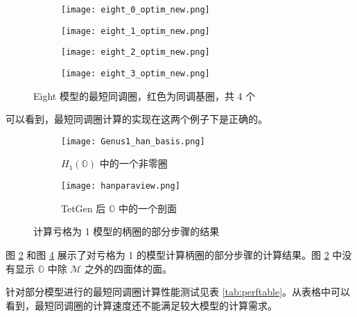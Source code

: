 \begin{figure}[h]
    \centering
    \begin{subfigure}{.2\textwidth}
        \centering
        \texttt{[image: eight\_0\_optim\_new.png]}
    \end{subfigure}
    \begin{subfigure}{.2\textwidth}
        \centering
        \texttt{[image: eight\_1\_optim\_new.png]}
    \end{subfigure}
    \begin{subfigure}{.2\textwidth}
        \centering
        \texttt{[image: eight\_2\_optim\_new.png]}
    \end{subfigure}
    \begin{subfigure}{.2\textwidth}
        \centering
        \texttt{[image: eight\_3\_optim\_new.png]}
    \end{subfigure}
    \caption{Eight 模型的最短同调圈，红色为同调基圈，共 4 个}
    \label{fig:eighthim}
\end{figure}

可以看到，最短同调圈计算的实现在这两个例子下是正确的。

\begin{figure}[h]
    \begin{subfigure}{.5\textwidth}
        \centering
        \texttt{[image: Genus1\_han\_basis.png]}
        \caption{$ H_1(\mathbb{O}) $ 中的一个非零圈}
        \label{fig:hanh1o}
    \end{subfigure}
    \begin{subfigure}{.5\textwidth}
        \centering
        \texttt{[image: hanparaview.png]}
        \caption{TetGen 后 $ \mathbb{O} $ 中的一个剖面}
        \label{fig:hanparaview}
    \end{subfigure}
    \caption{计算亏格为 1 模型的柄圈的部分步骤的结果}
\end{figure}

图 \ref{fig:hanh1o} 和图 \ref{fig:hanparaview} 展示了对亏格为 1 的模型计算柄圈的部分步骤的计算结果。图 \ref{fig:hanh1o} 中没有显示 $ \mathbb{O} $ 中除 $ \mathcal{M} $ 之外的四面体的面。

针对部分模型进行的最短同调圈计算性能测试见表 \ref{tab:perftable}。从表格中可以看到，最短同调圈的计算速度还不能满足较大模型的计算需求。

